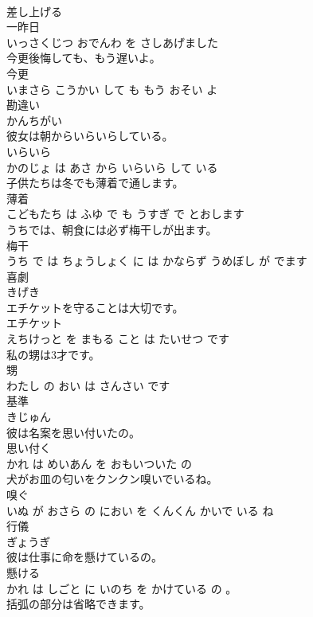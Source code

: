 \documentclass[8pt]{extreport}
\begin{document}
\begin{CJK}{UTF8}{min}
\\	差し上げる 
\\	一昨日 
\\	いっさくじつ おでんわ を さしあげました			
\\	今更後悔しても、もう遅いよ。	
\\	今更 
\\	いまさら こうかい して も もう おそい よ			
\\	勘違い	
\\	かんちがい		
\\	彼女は朝からいらいらしている。	
\\	いらいら 
\\	かのじょ は あさ から いらいら して いる			
\\	子供たちは冬でも薄着で通します。	
\\	薄着 
\\	こどもたち は ふゆ で も うすぎ で とおします			
\\	うちでは、朝食には必ず梅干しが出ます。	
\\	梅干 
\\	うち で は ちょうしょく に は かならず うめぼし が でます			
\\	喜劇	
\\	きげき		
\\	エチケットを守ることは大切です。	
\\	エチケット 
\\	えちけっと を まもる こと は たいせつ です			
\\	私の甥は3才です。	
\\	甥 
\\	わたし の おい は さんさい です			
\\	基準	
\\	きじゅん		
\\	彼は名案を思い付いたの。	
\\	思い付く 
\\	かれ は めいあん を おもいついた の			
\\	犬がお皿の匂いをクンクン嗅いでいるね。	
\\	嗅ぐ 
\\	いぬ が おさら の におい を くんくん かいで いる ね			
\\	行儀	
\\	ぎょうぎ		
\\	彼は仕事に命を懸けているの。	
\\	懸ける 
\\	かれ は しごと に いのち を かけている の 。			
\\	括弧の部分は省略できます。	

\end{CJK}
\end{document}
